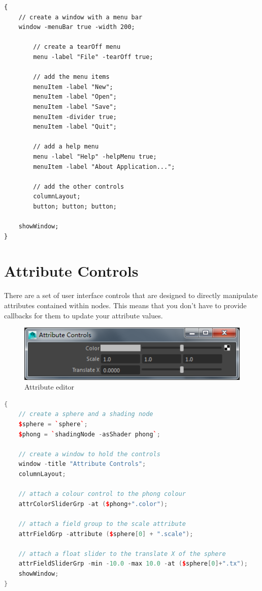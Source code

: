 \begin{lstlisting}
{
	// create a window with a menu bar
	window -menuBar true -width 200;
	
		// create a tearOff menu
		menu -label "File" -tearOff true;
		
		// add the menu items
		menuItem -label "New";
		menuItem -label "Open";
		menuItem -label "Save";
		menuItem -divider true;
		menuItem -label "Quit";
		
		// add a help menu
		menu -label "Help" -helpMenu true;
		menuItem -label "About Application...";
		
		// add the other controls
		columnLayout;
		button; button; button;
	
	showWindow;
}
\end{lstlisting}

\section{Attribute Controls}
There are a set of user interface controls that are designed to directly manipulate attributes contained within nodes. This means that you don't have to provide callbacks for them to update your attribute values.

\begin{figure}[tbh]
	\centering
	\includegraphics[width=0.4\linewidth]{figures/GUI/attribute_controls}
	\caption{Attribute editor}
	\label{fig:attributecontrols}
\end{figure}

\begin{lstlisting}[language = C++]
{	
	// create a sphere and a shading node
	$sphere = `sphere`;
	$phong = `shadingNode -asShader phong`;
	
	// create a window to hold the controls		
	window -title "Attribute Controls";
	columnLayout;
	
	// attach a colour control to the phong colour
	attrColorSliderGrp -at ($phong+".color");
	
	// attach a field group to the scale attribute
	attrFieldGrp -attribute ($sphere[0] + ".scale");
	
	// attach a float slider to the translate X of the sphere
	attrFieldSliderGrp -min -10.0 -max 10.0 -at ($sphere[0]+".tx");
	showWindow;
}
\end{lstlisting}

